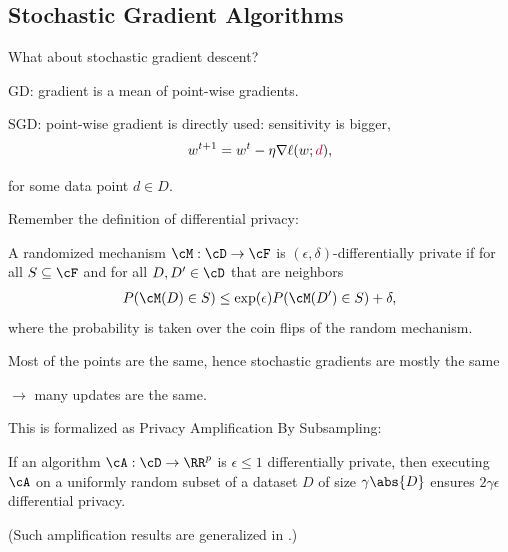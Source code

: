 \documentclass[notheorems]{beamer}
\begin{document}
\subsection{Stochastic Gradient Algorithms}
\label{sub:_stochastic_gradient_algorithms}


\begin{frame}
  What about stochastic gradient descent?

  \vspace{2em}

  GD: gradient is a mean of point-wise gradients.

  \vspace{1em}

  SGD: point-wise gradient is directly used: sensitivity is bigger,
  \begin{align*}
    w^{t+1} = w^t - \eta \nabla \ell(w; {\color{purple}d}),
  \end{align*}

  \color{purple}for some data point $d \in D$.
\end{frame}


\begin{frame}

  Remember the definition of differential privacy:
  \begin{definition}
    A randomized mechanism $\cM: \cD \rightarrow \cF$ is $(\epsilon, \delta)$-differentially private if for all $S \subseteq \cF$ and for all $D, D' \in \cD$ {\color{purple}that are neighbors}
    \begin{align}
      P(\cM(D) \in S) \le \exp(\epsilon) P(\cM(D') \in S) + \delta,
    \end{align}
    where the probability is taken over the coin flips of the random mechanism.
  \end{definition}

  \vspace{2em}

  Most of the points are the same, hence stochastic gradients are mostly the same

  \quad $\rightarrow$ many updates are the same.
\end{frame}

\begin{frame}
  This is formalized as Privacy Amplification By Subsampling:

  \begin{lemma}
    If an algorithm $\cA : \cD \rightarrow \RR^p$ is $\epsilon \le 1$ differentially private, then executing $\cA$ on a uniformly random subset of a dataset $D$ of size $\gamma \abs{D}$ ensures $2\gamma\epsilon$ differential privacy.
  \end{lemma}

  \vspace{1em}

   (Such amplification results are generalized in .)
\end{frame}
\end{document}
